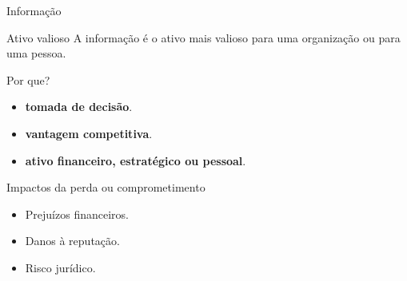 \begin{frame}{Informação}

\begin{block}{Ativo valioso}
A informação é o ativo mais valioso para uma organização ou para uma pessoa.
\end{block}

\begin{exampleblock}{Por que?}
\begin{itemize}
    \item \textbf{tomada de decisão}.
    \item \textbf{vantagem competitiva}.
    \item \textbf{ativo financeiro, estratégico ou pessoal}.
\end{itemize}
\end{exampleblock}

\begin{alertblock}{Impactos da perda ou comprometimento}
\begin{itemize}
    \item Prejuízos financeiros.
    \item Danos à reputação.
    \item Risco jurídico.
\end{itemize}
\end{alertblock}

\end{frame}

